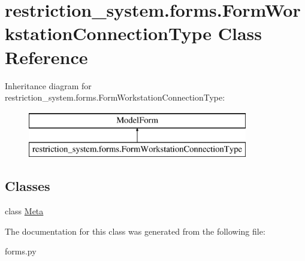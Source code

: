 \hypertarget{classrestriction__system_1_1forms_1_1FormWorkstationConnectionType}{}\section{restriction\+\_\+system.\+forms.\+Form\+Workstation\+Connection\+Type Class Reference}
\label{classrestriction__system_1_1forms_1_1FormWorkstationConnectionType}
Inheritance diagram for restriction\+\_\+system.\+forms.\+Form\+Workstation\+Connection\+Type\+:\begin{figure}[H]
\begin{center}
\leavevmode
\includegraphics[height=2.000000cm]{classrestriction__system_1_1forms_1_1FormWorkstationConnectionType}
\end{center}
\end{figure}
\subsection*{Classes}
\begin{DoxyCompactItemize}
\item 
class \hyperlink{classrestriction__system_1_1forms_1_1FormWorkstationConnectionType_1_1Meta}{Meta}
\end{DoxyCompactItemize}


The documentation for this class was generated from the following file\+:\begin{DoxyCompactItemize}
\item 
forms.\+py\end{DoxyCompactItemize}
